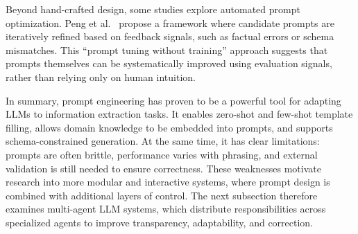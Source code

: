 Beyond hand-crafted design, some studies explore automated prompt optimization. Peng et al.\ \cite{peng2023check} propose a framework where candidate prompts are iteratively refined based on feedback signals, such as factual errors or schema mismatches. This “prompt tuning without training” approach suggests that prompts themselves can be systematically improved using evaluation signals, rather than relying only on human intuition.

In summary, prompt engineering has proven to be a powerful tool for adapting LLMs to information extraction tasks. It enables zero-shot and few-shot template filling, allows domain knowledge to be embedded into prompts, and supports schema-constrained generation. At the same time, it has clear limitations: prompts are often brittle, performance varies with phrasing, and external validation is still needed to ensure correctness. These weaknesses motivate research into more modular and interactive systems, where prompt design is combined with additional layers of control. The next subsection therefore examines multi-agent LLM systems, which distribute responsibilities across specialized agents to improve transparency, adaptability, and correction.
